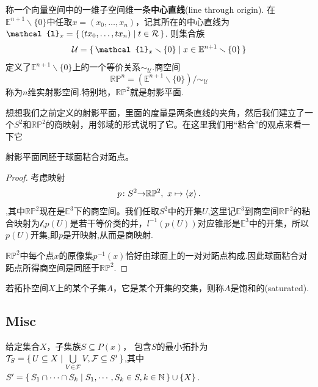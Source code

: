 \begin{definition}
称一个向量空间中的一维子空间维一条\textbf{中心直线}(line through origin). 在$\mathbb{E}^{n+1} \smallsetminus \{0\}$中任取$x=(x_0,\ldots,x_n)$，记其所在的中心直线为$\mathcal{l}_x=\Set{(tx_0,\ldots,tx_n)}{t \in \mathcal{R}}$. 则集合族\[\mathcal{U} = \Set{\mathcal{l}_x \smallsetminus \{0\} }{x \in \mathbb{E}^{n+1} \smallsetminus \{0\}}\]定义了$\mathbb{E}^{n+1} \smallsetminus \{0\}$上的一个等价关系$\sim_{\mathcal{U}}$.商空间\[\mathbb{R}\mathbb{P}^n=(\mathbb{E}^{n+1} \smallsetminus \{0\}) / \sim_{\mathcal{U}}\]称为$n$维实射影空间.特别地，$\mathbb{R}\mathbb{P}^2$就是射影平面.
\end{definition}

想想我们之前定义的射影平面，里面的度量是两条直线的夹角，然后我们建立了一个$S^2$和$\mathbb{R}\mathbb{P}^2$的商映射，用邻域的形式说明了它。在这里我们用“粘合”的观点来看一下它

\begin{example}
射影平面同胚于球面粘合对跖点。
\begin{proof}
考虑映射\[{p}\colon{S^2}{\to}{\mathbb{R}\mathbb{P}^2},\ x \mapsto \left< x \right>.\],其中$\mathbb{R}\mathbb{P}^2$现在是$\mathbb{E}^3$下的商空间。我们任取$S^2$中的开集$U$,这里记$\mathbb{E}^3$到商空间$\mathbb{R}\mathbb{P}^2$的粘合映射为$\mathcal{l}$,$p(U)$是若干等价类的并，$l^{-1}(p(U))$对应锥形是$\mathbb{E}^3$中的开集，所以$p(U)$开集,即$p$是开映射,从而是商映射.

$\mathbb{R}\mathbb{P}^2$中每个点$x$的原像集$p^{-1}(x)$恰好由球面上的一对对跖点构成.因此球面粘合对跖点所得商空间是同胚于$\mathbb{R}\mathbb{P}^2$.
\end{proof}
\end{example}

\begin{definition}
若拓扑空间$X$上的某个子集$A$，它是某个开集的交集，则称$A$是饱和的(saturated).
\end{definition}

\newpage
\subsection{Misc}

\begin{proposition}
给定集合$X$，子集族$S \subseteq P(x)$， 包含$S$的最小拓扑为$\mathcal{T}_S = \{\,U \subseteq X\mid\bigcup\limits_{V \in \mathcal{F}} V, \mathcal{F} \subseteq S'\,\}$,其中$S' = \{\,S_1 \cap \cdots \cap S_k\mid S_1,\cdots,S_k \in S, k \in \mathbb{N}\,\} \cup \{X\}$.
\end{proposition}

